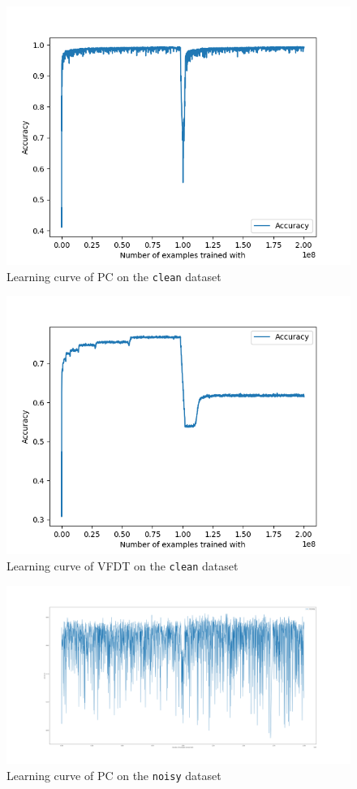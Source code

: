 \documentclass[12pt]{article}
\begin{document}
\begin{figure}
	\centering
	\includegraphics[width=.8\linewidth]{../plots/pc_clean}
	\caption{Learning curve of PC on the \texttt{clean} dataset}
	\label{fig:pc_clean}
\end{figure}
\begin{figure}
	\centering
	\includegraphics[width=.8\linewidth]{../plots/vfdt_clean}
	\caption{Learning curve of VFDT on the \texttt{clean} dataset}
	\label{fig:vfdt_clean}
\end{figure}
\begin{figure}
	\centering
	\includegraphics[width=.8\linewidth]{../plots/pc_noise}
	\caption{Learning curve of PC on the \texttt{noisy} dataset}
	\label{fig:pc_noise}
\end{figure}
\end{document}
